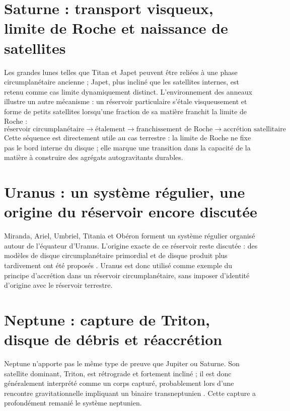 \documentclass[11pt,a4paper,openany]{report}
\begin{document}
\section{Saturne : transport visqueux, limite de Roche et naissance de satellites}

Les grandes lunes telles que Titan et Japet peuvent être reliées à une phase circumplanétaire
ancienne ; Japet, plus incliné que les satellites internes, est retenu comme cas limite
dynamiquement distinct. L'environnement des anneaux illustre un autre mécanisme : un
réservoir particulaire s'étale visqueusement et forme de petits satellites lorsqu'une fraction de
sa matière franchit la limite de Roche \cite{Charnoz2010,Blanc2025} :
\begin{equation}
\text{réservoir circumplanétaire}\to\text{étalement}\to
\text{franchissement de Roche}\to\text{accrétion satellitaire}
\label{eq:saturne}
\end{equation}
Cette séquence est directement utile au cas terrestre : la limite de Roche ne fixe pas le bord
interne du disque ; elle marque une transition dans la capacité de la matière à construire des
agrégats autogravitants durables.

\section{Uranus : un système régulier, une origine du réservoir encore discutée}

Miranda, Ariel, Umbriel, Titania et Obéron forment un système régulier organisé autour de
l'équateur d'Uranus. L'origine exacte de ce réservoir reste discutée : des modèles de disque
circumplanétaire primordial et de disque produit plus tardivement ont été proposés
\cite{Helled2020,Blanc2025}. Uranus est donc utilisé comme exemple du principe d'accrétion
dans un réservoir circumplanétaire, sans imposer d'identité d'origine avec le réservoir terrestre.


\section{Neptune : capture de Triton, disque de débris et réaccrétion}

Neptune n'apporte pas le même type de preuve que Jupiter ou Saturne. Son satellite dominant,
Triton, est rétrograde et fortement incliné ; il est donc généralement interprété comme un corps
capturé, probablement lors d'une rencontre gravitationnelle impliquant un binaire transneptunien
\cite{AgnorHamilton2006}. Cette capture a profondément remanié le système neptunien.
\end{document}
